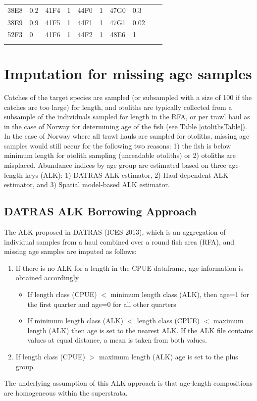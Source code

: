 \documentclass[a4paper 12pt]{article}
\numberwithin{equation}{section}
\begin{document}
\begin{small}
\begin{table}[h!]
\begin{footnotesize}
\begin{tabular}{clclclclcl}
 38E8 &  0.2 & 41F4 &    1 & 44F0 &    1 & 47G0 &  0.3 &  &  \\ 
 38E9 &  0.9 & 41F5 &    1 & 44F1 &    1 & 47G1 & 0.02 &  &  \\ 
 52F3 &    0 & 41F6 &    1 & 44F2 &    1 & 48E6 &    1 &  &  \\ 
   \hline \\[0.8ex]
\end{tabular}
\label{tab:weights}
\end{footnotesize}
\end{table}
 \end{small}
 
\section{\large Imputation for missing age samples}
\label{sec:imputationappendix}
Catches of the target species are sampled (or subsampled with a size of 100 if the catches are too large) for length, and otoliths are typically collected from a subsample of the individuals sampled for length in the RFA,  or per trawl haul as in the case of Norway for determining age of the fish (see Table \ref{otolithsTable}). In the case of Norway where all trawl hauls are sampled for otoliths, missing age samples would still occur for the following two reasons: 1) the fish is below minimum length for otolith sampling (unreadable otoliths) or 2) otoliths are misplaced. Abundance indices by age group are estimated based on three age-length-keys (ALK): 1) DATRAS ALK estimator, 2) Haul dependent ALK estimator, and 3) Spatial model-based ALK estimator.
\subsection{\normalsize DATRAS ALK Borrowing Approach}
\label{secAp:DATRASBorrow}
The ALK proposed in DATRAS (ICES 2013), which is an aggregation of individual samples from a haul combined over a round fish area (RFA), and missing age samples are imputed as follows: 
\begin{enumerate}
\item If there is no ALK for a length in the CPUE dataframe, age information is obtained accordingly
\begin{itemize}
\item If length class (CPUE) $<$ minimum length class (ALK), then age=1 for the first quarter and age=0 for all other quarters
\item  If minimum length class (ALK) $<$ length class (CPUE) $<$ maximum length (ALK) then age is set to the nearest ALK. If the ALK file contains values at equal distance, a mean is taken from both values. 
\end{itemize}
\item If length class (CPUE) $>$ maximum length (ALK) age is set to the plus group.
\end{enumerate}
The underlying assumption of this ALK approach is that age-length compositions are homogeneous within the superstrata. 
\end{document}
